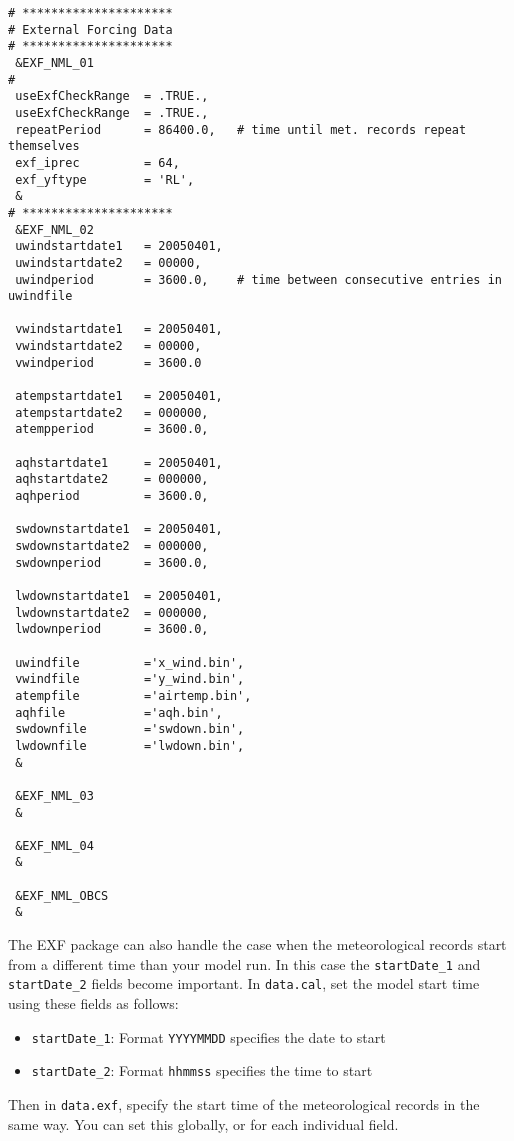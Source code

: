 \documentclass[11pt]{article}
\begin{document}
\begin{lstlisting}[caption={Sample \texttt{data.exf} file. This instance has meteorological records every $\SI{3600}{s}$ ($\SI{1}{h}$).}, label={listing:data.exf}]
# *********************
# External Forcing Data
# *********************
 &EXF_NML_01
#
 useExfCheckRange  = .TRUE.,
 useExfCheckRange  = .TRUE.,
 repeatPeriod      = 86400.0,	# time until met. records repeat themselves
 exf_iprec         = 64,
 exf_yftype        = 'RL',
 &
# *********************
 &EXF_NML_02
 uwindstartdate1   = 20050401,
 uwindstartdate2   = 00000,
 uwindperiod       = 3600.0,	# time between consecutive entries in uwindfile

 vwindstartdate1   = 20050401,
 vwindstartdate2   = 00000,
 vwindperiod       = 3600.0

 atempstartdate1   = 20050401,
 atempstartdate2   = 000000,
 atempperiod       = 3600.0,

 aqhstartdate1     = 20050401,
 aqhstartdate2     = 000000,
 aqhperiod         = 3600.0,

 swdownstartdate1  = 20050401,
 swdownstartdate2  = 000000,
 swdownperiod      = 3600.0,

 lwdownstartdate1  = 20050401,
 lwdownstartdate2  = 000000,
 lwdownperiod      = 3600.0,

 uwindfile         ='x_wind.bin',
 vwindfile         ='y_wind.bin',
 atempfile         ='airtemp.bin',
 aqhfile           ='aqh.bin',
 swdownfile        ='swdown.bin',
 lwdownfile        ='lwdown.bin',
 &

 &EXF_NML_03
 &

 &EXF_NML_04
 &

 &EXF_NML_OBCS
 &
\end{lstlisting}

The EXF package can also handle the case when the meteorological records start from a different time than your model run. In this case the \verb|startDate_1| and \verb|startDate_2| fields become important. In \verb|data.cal|, set the model start time using these fields as follows:
\begin{itemize}
\item{\verb|startDate_1|: Format \verb|YYYYMMDD| specifies the date to start}
\item{\verb|startDate_2|: Format \verb|hhmmss| specifies the time to start}
\end{itemize}
Then in \verb|data.exf|, specify the start time of the meteorological records in the same way. You can set this globally, or for each individual field.
\end{document}

